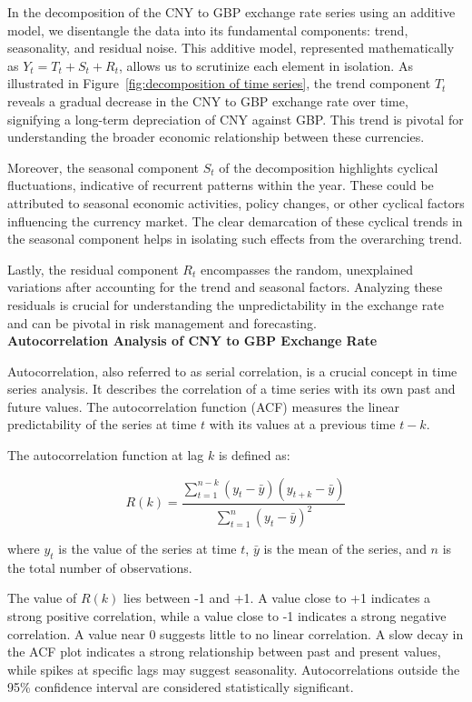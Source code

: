 \documentclass{article}\usepackage[]{graphicx}\usepackage[]{xcolor}
\begin{document}
In the decomposition of the CNY to GBP exchange rate series using an additive model, we disentangle the data into its fundamental components: trend, seasonality, and residual noise. This additive model, represented mathematically as $Y_t = T_t + S_t + R_t$, allows us to scrutinize each element in isolation. As illustrated in Figure~\ref{fig:decomposition of time series}, the trend component $T_t$ reveals a gradual decrease in the CNY to GBP exchange rate over time, signifying a long-term depreciation of CNY against GBP. This trend is pivotal for understanding the broader economic relationship between these currencies. 

Moreover, the seasonal component $S_t$ of the decomposition highlights cyclical fluctuations, indicative of recurrent patterns within the year. These could be attributed to seasonal economic activities, policy changes, or other cyclical factors influencing the currency market. The clear demarcation of these cyclical trends in the seasonal component helps in isolating such effects from the overarching trend.

Lastly, the residual component $R_t$ encompasses the random, unexplained variations after accounting for the trend and seasonal factors. Analyzing these residuals is crucial for understanding the unpredictability in the exchange rate and can be pivotal in risk management and forecasting.\\

\noindent
\textbf{Autocorrelation Analysis of CNY to GBP Exchange Rate}

Autocorrelation, also referred to as serial correlation, is a crucial concept in time series analysis. It describes the correlation of a time series with its own past and future values. The autocorrelation function (ACF) measures the linear predictability of the series at time \( t \) with its values at a previous time \( t-k \).

The autocorrelation function at lag \( k \) is defined as:

\[
R(k) = \frac{\sum_{t=1}^{n-k} (y_t - \bar{y})(y_{t+k} - \bar{y})}{\sum_{t=1}^{n} (y_t - \bar{y})^2}
\]

where \( y_t \) is the value of the series at time \( t \), \( \bar{y} \) is the mean of the series, and \( n \) is the total number of observations.

The value of \( R(k) \) lies between -1 and +1. A value close to +1 indicates a strong positive correlation, while a value close to -1 indicates a strong negative correlation. A value near 0 suggests little to no linear correlation. A slow decay in the ACF plot indicates a strong relationship between past and present values, while spikes at specific lags may suggest seasonality. Autocorrelations outside the 95\% confidence interval are considered statistically significant.
\end{document}
